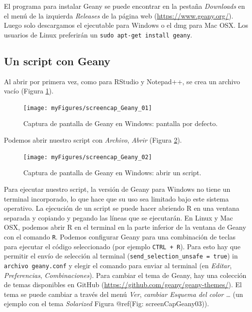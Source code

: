 \documentclass[
]{book}
\begin{document}
El programa para instalar Geany se puede encontrar en la pestaña \emph{Downloads} en el menú de la izquierda \emph{Releases} de la página web (\url{https://www.geany.org/}). Luego solo descargamos el ejecutable para Windows o el dmg para Mac OSX. Los usuarios de Linux preferirán un \texttt{sudo\ apt-get\ install\ geany}.

\hypertarget{un-script-con-geany}{%
\subsection{Un script con Geany}\label{un-script-con-geany}}

Al abrir por primera vez, como para RStudio y Notepad++, se crea un archivo vacío (Figura \ref{fig:screenCapGeany01}).

\begin{figure}
\texttt{[image: myFigures/screencap\_Geany\_01]} \caption{Captura de pantalla de Geany en Windows: pantalla por defecto.\label{fig:screenCapGeany01}}\label{fig:screenCapGeany01}
\end{figure}

Podemos abrir nuestro script con \emph{Archivo}, \emph{Abrir} (Figura \ref{fig:screenCapGeany02}).

\begin{figure}
\texttt{[image: myFigures/screencap\_Geany\_02]} \caption{Captura de pantalla de Geany en Windows: abrir un script.\label{fig:screenCapGeany02}}\label{fig:screenCapGeany02}
\end{figure}

Para ejecutar nuestro script, la versión de Geany para Windows no tiene un terminal incorporado, lo que hace que su uso sea limitado bajo este sistema operativo. La ejecución de un script se puede hacer abriendo R en una ventana separada y copiando y pegando las líneas que se ejecutarán. En Linux y Mac OSX, podemos abrir R en el terminal en la parte inferior de la ventana de Geany con el comando \texttt{R}. Podemos configurar Geany para una combinación de teclas para ejecutar el código seleccionado (por ejemplo \texttt{CTRL\ +\ R}). Para esto hay que permitir el envío de selección al terminal (\texttt{send\_selection\_unsafe\ =\ true}) in \texttt{archivo\ geany.conf} y elegir el comando para enviar al terminal (en \emph{Editar}, \emph{Preferencias}, \emph{Combinaciones}).
Para cambiar el tema de Geany, hay una colección de temas disponibles en GitHub (\url{https://github.com/geany/geany-themes/}). El tema se puede cambiar a través del menú \emph{Ver}, \emph{cambiar Esquema del color \ldots{}} (un ejemplo con el tema \emph{Solarized} Figura @ref(Fig: screenCapGeany03)).
\end{document}
